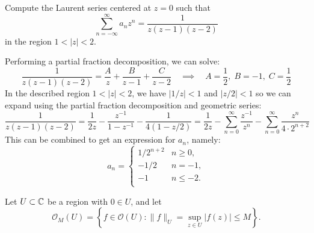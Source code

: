 \documentclass{pset}
\begin{document}
\begin{problem}{13}
  Compute the Laurent series centered at $z=0$ such that
  \[
    \sum^\infty_{n=-\infty} a_n z^n = \frac{1}{z(z-1)(z-2)}
  \]
  in the region $1<|z|<2$.
\end{problem}

\begin{solution}
  Performing a partial fraction decomposition, we can solve:
  \[\frac{1}{z(z-1)(z-2)} = \frac{A}{z} + \frac{B}{z-1} + \frac{C}{z-2} \quad\implies\quad A = \frac{1}{2},\; B = -1,\; C = \frac{1}{2}\]
  In the described region $1 < |z| < 2$, we have $|1 / z| < 1$ and $|z / 2| < 1$ so we can expand using the partial fraction decomposition and geometric series:
  \[\frac{1}{z(z-1)(z-2)} = \frac{1}{2z} - \frac{z^{-1}}{1-z^{-1}} - \frac{1}{4(1-z / 2)}=\frac{1}{2z} - \sum^\infty_{n=0}\frac{z^{-1}}{z^n} - \sum^\infty_{n=0}\frac{z^n}{4\cdot 2^{n+2}}\]
  This can be combined to get an expression for $a_n$, namely:
  \[a_n = \begin{cases}
  1 / 2^{n+2} & n\geq 0,\\
  -1 /2 &n = -1,\\
  -1 &n \leq -2.\\
  \end{cases}\]
\end{solution}

\begin{problem}{15}
  Let $U\subset \mathbb{C}$ be a region with $0\in U$, and let
  \[
    \mathcal{O}_M(U) = \left\{f\in \mathcal{O}(U) : \|f\|_U = \sup_{z\in U} |f(z)| \leq M\right\}.
  \]
\end{problem}
\end{document}
